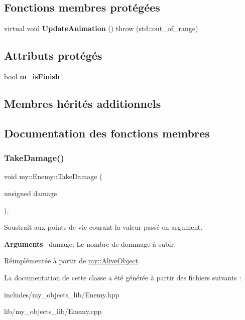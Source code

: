 \subsection*{Fonctions membres protégées}
\begin{DoxyCompactItemize}
\item 
\mbox{\label{classmy_1_1Enemy_a2257e77a7afcea3a210ffb0ea8f2806e}} 
virtual void {\bfseries Update\+Animation} ()  throw (std\+::out\+\_\+of\+\_\+range)
\end{DoxyCompactItemize}
\subsection*{Attributs protégés}
\begin{DoxyCompactItemize}
\item 
\mbox{\label{classmy_1_1Enemy_ae931fb8aca0540eeaf99e28cb2098793}} 
bool {\bfseries m\+\_\+is\+Finish}
\end{DoxyCompactItemize}
\subsection*{Membres hérités additionnels}


\subsection{Documentation des fonctions membres}
\mbox{\label{classmy_1_1Enemy_a38251585de243212ad04d5bbc2843f50}} 
\subsubsection{\texorpdfstring{Take\+Damage()}{TakeDamage()}}
{\footnotesize\ttfamily void my\+::\+Enemy\+::\+Take\+Damage (\begin{DoxyParamCaption}\item[{unsigned}]{damage }\end{DoxyParamCaption})\hspace{0.3cm}{\ttfamily [virtual]}, {\ttfamily [noexcept]}}



Soustrait aux points de vie courant la valeur passé en argument. 

{\bfseries Arguments}~\newline
 damage\+: Le nombre de dommage à subir. 

Réimplémentée à partir de \hyperlink{classmy_1_1AliveObject_a4c13171af7b862e15bfd1737a75dab75}{my\+::\+Alive\+Object}.



La documentation de cette classe a été générée à partir des fichiers suivants \+:\begin{DoxyCompactItemize}
\item 
includes/my\+\_\+objects\+\_\+lib/Enemy.\+hpp\item 
lib/my\+\_\+objects\+\_\+lib/Enemy.\+cpp\end{DoxyCompactItemize}
